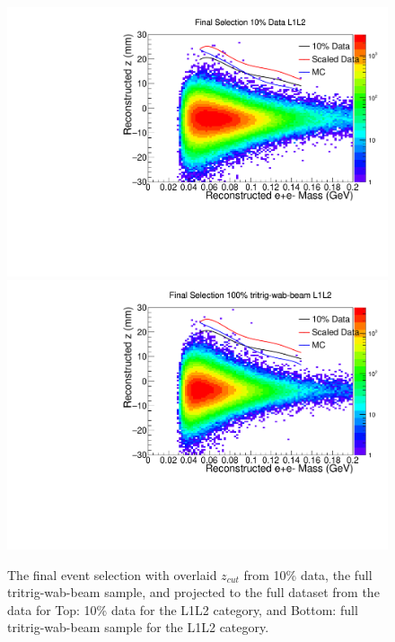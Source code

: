\begin{figure}[t]
    \centering
    \includegraphics[width=.85\textwidth]{figs/Results/data_L1L2_final_vz_mass_zcut.pdf}
    \includegraphics[width=.85\textwidth]{figs/Results/mc_L1L2_final_vz_mass_zcut.pdf}
    \caption{The final event selection with overlaid $z_{cut}$ from 10\% data, the full tritrig-wab-beam sample, and projected to the full dataset from the data for Top: 10\% data for the L1L2 category, and Bottom: full tritrig-wab-beam sample for the L1L2 category.
    }
    \label{fig:final_zcut_L1L2}
\end{figure}


